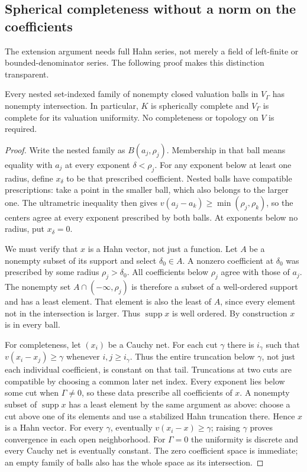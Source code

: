 \documentclass[11pt,letterpaper]{article}
\numberwithin{equation}{section}
\theoremstyle{definition}
\theoremstyle{remark}
\newcommand{\supp}{\operatorname{supp}}
\begin{document}
\subsection{Spherical completeness without a norm on the coefficients}
The extension argument needs full Hahn series, not merely a field of
left-finite or bounded-denominator series. The following proof makes
this distinction transparent.

\begin{proposition}
\label{duals:prop:spherical}
Every nested set-indexed family of nonempty closed valuation balls in
$V_\Gamma$ has nonempty intersection. In particular, $K$ is spherically
complete and $V_\Gamma$ is complete for its valuation uniformity.
No completeness or topology on $V$ is required.
\end{proposition}
\begin{proof}
Write the nested family as $B(a_j,\rho_j)$. Membership in that ball
means equality with $a_j$ at every exponent $\delta<\rho_j$.
For any exponent below at least one radius, define $x_\delta$ to be
that prescribed coefficient. Nested balls have compatible prescriptions: take a point in the smaller
ball, which also belongs to the larger one. The ultrametric inequality
then gives $v(a_j-a_k)\ge\min(\rho_j,\rho_k)$, so the centers agree
at every exponent prescribed by both balls. At exponents below no
radius, put $x_\delta=0$.

We must verify that $x$ is a Hahn vector, not just a function.
Let $A$ be a nonempty subset of its support and select $\delta_0\in A$.
A nonzero coefficient at $\delta_0$ was prescribed by some radius
$\rho_j>\delta_0$. All coefficients below $\rho_j$ agree with those
of $a_j$. The nonempty set $A\cap(-\infty,\rho_j)$ is therefore a
subset of a well-ordered support and has a least element. That element
is also the least of $A$, since every element not in the intersection
is larger. Thus $\supp x$ is well ordered. By construction $x$ is in
every ball.

For completeness, let $(x_i)$ be a Cauchy net. For each cut $\gamma$
there is $i_\gamma$ such that $v(x_i-x_j)\ge\gamma$ whenever
$i,j\ge i_\gamma$. Thus the entire truncation below $\gamma$, not just
each individual coefficient, is constant on that tail. Truncations at
two cuts are compatible by choosing a common later net index.
Every exponent lies below some cut when $\Gamma\ne0$, so these data
prescribe all coefficients of $x$. A nonempty subset of $\supp x$ has
a least element by the same argument as above: choose a cut above one
of its elements and use a stabilized Hahn truncation there. Hence $x$
is a Hahn vector. For every $\gamma$, eventually $v(x_i-x)\ge\gamma$;
raising $\gamma$ proves convergence in each open neighborhood.
For $\Gamma=0$ the uniformity is discrete and every Cauchy net is
eventually constant. The zero coefficient space is immediate; an empty
family of balls also has the whole space as its intersection.
\end{proof}
\end{document}
